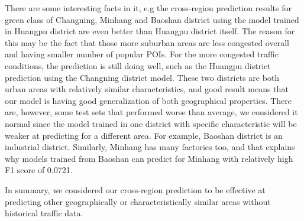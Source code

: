 There are some interesting facts in it, e.g the cross-region prediction results for green class of Changning, Minhang and Baoshan district using the model trained in Huangpu district are even better than Huangpu district itself. The reason for this may be the fact that those more suburban areas are less congested overall and having smaller number of popular POIs. For the more congested traffic conditions, the prediction is still doing well, such as the Huangpu district prediction using the Changning district model. These two districts are both urban areas with relatively similar characteristics, and good result means that our model is having good generalization of both geographical properties. There are, however, some test sets that performed worse than average, we considered it normal since the model trained in one district with specific characteristic will be weaker at predicting for a different area. For example, Baoshan district is an industrial district. Similarly, Minhang has many factories too, and that explains why models trained from Baoshan can predict for Minhang with relatively high F1 score of 0.0721.

In summary, we considered our cross-region prediction to be effective at predicting other geographically or characteristically similar areas without historical traffic data.

